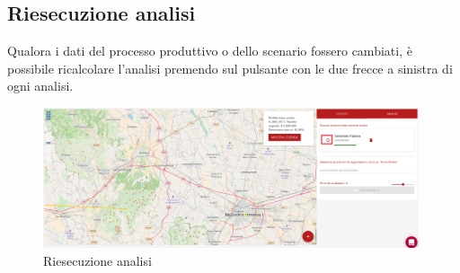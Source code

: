 \subsection{Riesecuzione analisi}
	Qualora i dati del processo produttivo o dello scenario fossero cambiati, è possibile ricalcolare l'analisi premendo sul pulsante con le due frecce a sinistra di ogni analisi.
	
	\begin{figure}[H]
		\centering
		\includegraphics[width=\textwidth]{img/riesecuzione_analisi.png}
		\caption{Riesecuzione analisi}
	\end{figure}


